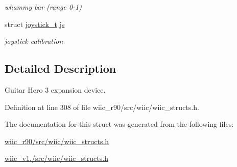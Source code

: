 \begin{DoxyCompactItemize}
\begin{DoxyCompactList}\small\item\em whammy bar (range 0-\/1) \end{DoxyCompactList}\item 
\hypertarget{structguitar__hero__3__t_ad35940d97c2fedc7776efb225742f651}{struct \hyperlink{structjoystick__t}{joystick\-\_\-t} \hyperlink{structguitar__hero__3__t_ad35940d97c2fedc7776efb225742f651}{js}}\label{structguitar__hero__3__t_ad35940d97c2fedc7776efb225742f651}

\begin{DoxyCompactList}\small\item\em joystick calibration \end{DoxyCompactList}\end{DoxyCompactItemize}


\subsection{Detailed Description}
Guitar Hero 3 expansion device. 

Definition at line 308 of file wiic\-\_\-r90/src/wiic/wiic\-\_\-structs.\-h.



The documentation for this struct was generated from the following files\-:\begin{DoxyCompactItemize}
\item 
\hyperlink{wiic__r90_2src_2wiic_2wiic__structs_8h}{wiic\-\_\-r90/src/wiic/wiic\-\_\-structs.\-h}\item 
\hyperlink{wiic__v1_81_2src_2wiic_2wiic__structs_8h}{wiic\-\_\-v1./src/wiic/wiic\-\_\-structs.\-h}\end{DoxyCompactItemize}
